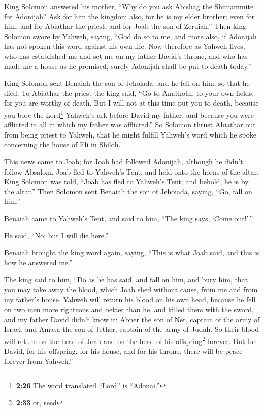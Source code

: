  King Solomon answered his mother, ``Why do you ask
Abishag the Shunammite for Adonijah? Ask for him the kingdom also, for
he is my elder brother; even for him, and for Abiathar the priest, and
for Joab the son of Zeruiah.''  Then king Solomon swore
by Yahweh, saying, ``God do so to me, and more also, if Adonijah has not
spoken this word against his own life.  Now therefore as
Yahweh lives, who has established me and set me on my father David's
throne, and who has made me a house as he promised, surely Adonijah
shall be put to death today.''

 King Solomon sent Benaiah the son of Jehoiada; and he
fell on him, so that he died.  To Abiathar the priest the
king said, ``Go to Anathoth, to your own fields, for you are worthy of
death. But I will not at this time put you to death, because you bore
the Lord\footnote{\textbf{2:26} The word translated ``Lord'' is
  ``Adonai.''} Yahweh's ark before David my father, and because you were
afflicted in all in which my father was afflicted.''  So
Solomon thrust Abiathar out from being priest to Yahweh, that he might
fulfill Yahweh's word which he spoke concerning the house of Eli in
Shiloh.

 This news came to Joab; for Joab had followed Adonijah,
although he didn't follow Absalom. Joab fled to Yahweh's Tent, and held
onto the horns of the altar.  King Solomon was told,
``Joab has fled to Yahweh's Tent; and behold, he is by the altar.'' Then
Solomon sent Benaiah the son of Jehoiada, saying, ``Go, fall on him.''

 Benaiah came to Yahweh's Tent, and said to him, ``The
king says, `Come out!'\,''

He said, ``No; but I will die here.''

Benaiah brought the king word again, saying, ``This is what Joab said,
and this is how he answered me.''

 The king said to him, ``Do as he has said, and fall on
him, and bury him, that you may take away the blood, which Joab shed
without cause, from me and from my father's house. 
Yahweh will return his blood on his own head, because he fell on two men
more righteous and better than he, and killed them with the sword, and
my father David didn't know it: Abner the son of Ner, captain of the
army of Israel, and Amasa the son of Jether, captain of the army of
Judah.  So their blood will return on the head of Joab
and on the head of his offspring\footnote{\textbf{2:33} or, seed}
forever. But for David, for his offspring, for his house, and for his
throne, there will be peace forever from Yahweh.''

